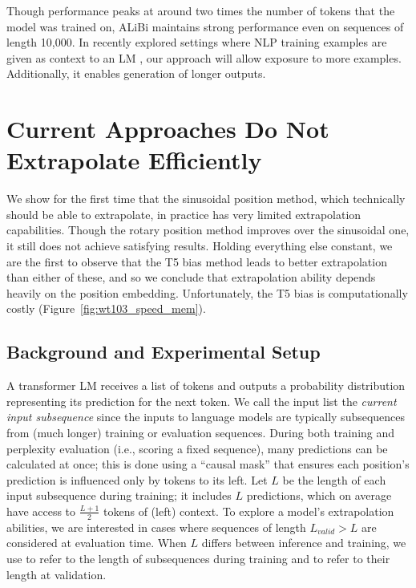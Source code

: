 Though performance peaks at around two times the number of tokens that the model was trained on, ALiBi maintains strong performance even on sequences of length 10,000. 
In recently explored settings where NLP training examples are given as context to an LM \citep{gpt3}, our approach will allow exposure to more examples. Additionally, it enables generation of longer outputs.

\section{Current Approaches Do Not Extrapolate Efficiently }
\label{sec:act2}

 

We show for the first time that the sinusoidal position method, which technically should be able to extrapolate, in practice has very limited extrapolation capabilities. Though the rotary position method improves over the sinusoidal one, it still does not achieve satisfying results.  Holding everything else constant, we are the first to observe that the T5 bias method leads to better extrapolation than either of these, and so we conclude that extrapolation ability depends heavily on the position embedding.  Unfortunately, the T5 bias is computationally costly (Figure~\ref{fig:wt103_speed_mem}).

\subsection{Background and Experimental Setup}

A transformer LM receives a list of tokens 
and outputs a probability distribution representing its prediction for the next token.  We call the input list the \textit{current input subsequence} since the inputs to language models are typically subsequences from (much longer) training or evaluation sequences.  During both training and perplexity evaluation (i.e., scoring a fixed sequence), many predictions can be calculated at once; this is done using a ``causal mask'' that ensures each position's prediction is influenced only by tokens to its left.  Let $L$ be the length of each input subsequence during training; it includes $L$ predictions, which on average have access to $\frac{L+1}{2}$ tokens of (left) context.  %
To explore a model's extrapolation abilities, we are interested in cases where sequences of length $L_{\textit{valid}} > L$ are considered at evaluation time. %
When $L$ differs between inference and training, we use \lt to refer to the length of subsequences during training and \li  to refer to their length at validation. 

